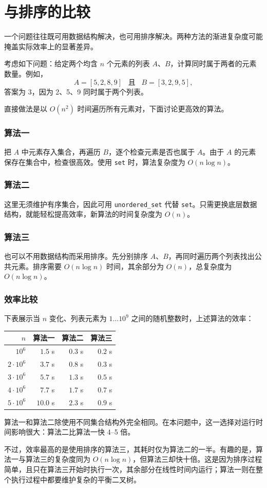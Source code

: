 \section{与排序的比较}

一个问题往往既可用数据结构解决，也可用排序解决。两种方法的渐进复杂度可能掩盖实际效率上的显著差异。

考虑如下问题：给定两个均含 $n$ 个元素的列表 $A$、$B$，计算同时属于两者的元素数量。例如，
\[A = [5,2,8,9] \hspace{10pt} \textrm{且} \hspace{10pt} B = [3,2,9,5],\]
答案为 3，因为 2、5、9 同时属于两个列表。

直接做法是以 $O(n^2)$ 时间遍历所有元素对，下面讨论更高效的算法。

\subsubsection{算法一}

把 $A$ 中元素存入集合，再遍历 $B$，逐个检查元素是否也属于 $A$。由于 $A$ 的元素保存在集合中，检查很高效。使用 \texttt{set} 时，算法复杂度为 $O(n \log n)$。

\subsubsection{算法二}

这里无须维护有序集合，因此可用 \texttt{unordered\_set} 代替 \texttt{set}。只需更换底层数据结构，就能轻松提高效率，新算法的时间复杂度为 $O(n)$。

\subsubsection{算法三}

也可以不用数据结构而采用排序。先分别排序 $A$、$B$，再同时遍历两个列表找出公共元素。排序需要 $O(n \log n)$ 时间，其余部分为 $O(n)$，总复杂度为 $O(n \log n)$。

\subsubsection{效率比较}

下表展示当 $n$ 变化、列表元素为 $1 \ldots 10^9$ 之间的随机整数时，上述算法的效率：

\begin{center}
\begin{tabular}{rrrr}
$n$ & 算法一 & 算法二 & 算法三 \\
\hline
$10^6$ & $1.5$ s & $0.3$ s & $0.2$ s \\
$2 \cdot 10^6$ & $3.7$ s & $0.8$ s & $0.3$ s \\
$3 \cdot 10^6$ & $5.7$ s & $1.3$ s & $0.5$ s \\
$4 \cdot 10^6$ & $7.7$ s & $1.7$ s & $0.7$ s \\
$5 \cdot 10^6$ & $10.0$ s & $2.3$ s & $0.9$ s \\
\end{tabular}
\end{center}

算法一和算法二除使用不同集合结构外完全相同。在本问题中，这一选择对运行时间影响很大：算法二比算法一快 4--5 倍。

不过，效率最高的是使用排序的算法三，其耗时仅为算法二的一半。有趣的是，算法一与算法三的复杂度同为 $O(n \log n)$，但算法三却快十倍。这是因为排序过程简单，且只在算法三开始时执行一次，其余部分在线性时间内运行；算法一则在整个执行过程中都要维护复杂的平衡二叉树。
